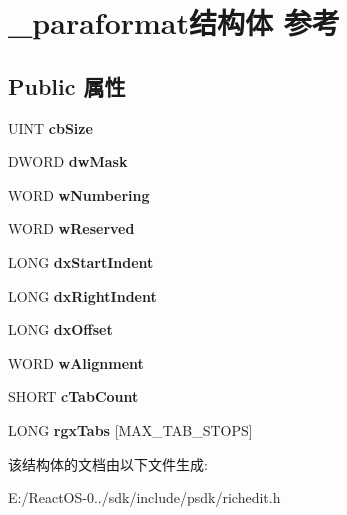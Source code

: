 \hypertarget{struct__paraformat}{}\section{\+\_\+paraformat结构体 参考}
\label{struct__paraformat}
\subsection*{Public 属性}
\begin{DoxyCompactItemize}
\item 
\mbox{\label{struct__paraformat_a64e03eb7386c5e029c5a15b97f9b0e98}} 
U\+I\+NT {\bfseries cb\+Size}
\item 
\mbox{\label{struct__paraformat_a27186cafa89e4796b9a2fbd6d5ded05e}} 
D\+W\+O\+RD {\bfseries dw\+Mask}
\item 
\mbox{\label{struct__paraformat_ae343c2d1f61b8afd3d74d2c59f529119}} 
W\+O\+RD {\bfseries w\+Numbering}
\item 
\mbox{\label{struct__paraformat_a3f845e41b522a4eec22a4c671c6bd0c1}} 
W\+O\+RD {\bfseries w\+Reserved}
\item 
\mbox{\label{struct__paraformat_a6931ff48d4cb4cd8b2ae14cdfe2a9deb}} 
L\+O\+NG {\bfseries dx\+Start\+Indent}
\item 
\mbox{\label{struct__paraformat_a5ce90ec54d286321caf6921b803f8972}} 
L\+O\+NG {\bfseries dx\+Right\+Indent}
\item 
\mbox{\label{struct__paraformat_a4a3e7691484d84da3eb90e379a48d049}} 
L\+O\+NG {\bfseries dx\+Offset}
\item 
\mbox{\label{struct__paraformat_a4af99b587fd6716cbdf46962c74e5da5}} 
W\+O\+RD {\bfseries w\+Alignment}
\item 
\mbox{\label{struct__paraformat_a844b89e6d0ddd75c25fb3f776c9b130e}} 
S\+H\+O\+RT {\bfseries c\+Tab\+Count}
\item 
\mbox{\label{struct__paraformat_af0053479f55b6d4051fe3e6858370f61}} 
L\+O\+NG {\bfseries rgx\+Tabs} \mbox{[}M\+A\+X\+\_\+\+T\+A\+B\+\_\+\+S\+T\+O\+PS\mbox{]}
\end{DoxyCompactItemize}


该结构体的文档由以下文件生成\+:\begin{DoxyCompactItemize}
\item 
E\+:/\+React\+O\+S-\/0../sdk/include/psdk/richedit.\+h\end{DoxyCompactItemize}
